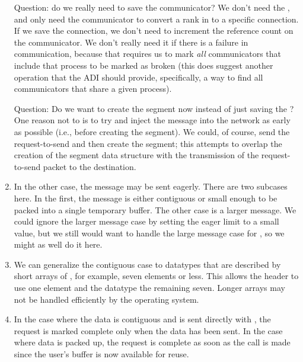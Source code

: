 \begin{enumerate}
  Question: do we really need to save the communicator?  We don't need the
  , and only need the communicator to convert a rank in to a
  specific connection.  If we save the connection, we don't need to increment
  the reference count on the communicator.  We don't really need it if there
  is a failure in communication, because that requires us to mark \emph{all}
  communicators that include that process to be marked as broken (this does
  suggest another operation that the ADI should provide, specifically, a way
  to find all communicators that share a given process).

  Question: Do we want to create the segment now instead of just saving the 
  ?  One reason not to is to try and inject the 
  message into the network as early as possible (i.e., before creating the
  segment).  We could, of course, send the request-to-send and then create the
  segment; this attempts to overlap the creation of the segment data structure
  with the transmission of the request-to-send packet to the destination.

\item In the other case, the message may be sent eagerly.  There are two
  subcases here.  In the first, the message is either contiguous or small
  enough to be packed into a single temporary buffer.  The other case is a
  larger message.  We could ignore the larger message case by setting the
  eager limit to a small value, but we still would want to handle the large
  message case for , so we might as well do it here.


\item We can generalize the contiguous case to datatypes that are described by
  short arrays of , for example, seven elements or less.
  This allows the header to use one element and the datatype the remaining
  seven.  Longer arrays may not be handled efficiently by the operating
  system. 

\item In the case where the data is contiguous and is sent directly with
  , the request is marked complete only when the data has
  been sent.  In the case where data is packed up, the request is complete as
  soon as the  call is made since the user's buffer is now
  available for reuse.  


\end{enumerate}
